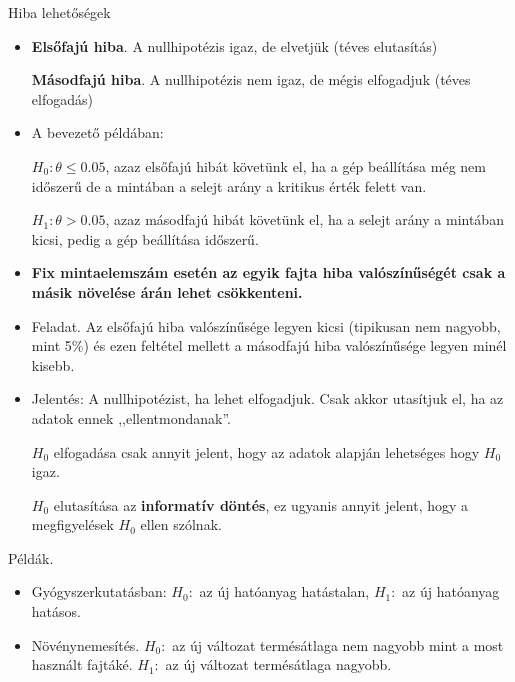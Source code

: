 \documentclass[aspectratio=169,notheorems,9pt,\option]{beamer}
\begin{document}
  
  \begin{frame}{Hiba lehetőségek}
   
    \begin{itemize}
    \item 
    
    \textbf{Elsőfajú hiba}. A nullhipotézis igaz, de elvetjük
      (téves elutasítás)
    
      \textbf{Másodfajú hiba}. A nullhipotézis nem igaz, de mégis elfogadjuk
      (téves elfogadás)
    
    \item A bevezető példában: 
    
    $H_0: \theta\leq0.05$, azaz elsőfajú hibát követünk el, ha a gép beállítása még nem időszerű
    de a mintában a selejt arány a kritikus érték felett van.

    $H_1: \theta>0.05$, azaz másodfajú hibát követünk el, ha a selejt arány a mintában kicsi, pedig a gép beállítása időszerű.

    \item \textbf{Fix mintaelemszám esetén az egyik fajta hiba valószínűségét
      csak a másik növelése árán lehet csökkenteni.}
      
    \item Feladat. Az elsőfajú hiba valószínűsége legyen kicsi (tipikusan
      nem nagyobb, mint 5\%) és ezen feltétel mellett a másodfajú hiba valószínűsége
      legyen minél kisebb.

    \item Jelentés: A nullhipotézist, ha lehet elfogadjuk. Csak akkor
      utasítjuk el, ha az adatok ennek ,,ellentmondanak''.
  
      $H_0$ elfogadása csak annyit jelent, hogy az adatok alapján lehetséges
      hogy  $H_0$ igaz.
  
      $H_0$ elutasítása az \textbf{informatív döntés}, ez ugyanis annyit jelent,
      hogy a megfigyelések $H_0$ ellen szólnak. %
    \end{itemize}
  
    \continue
    Példák.
    \begin{itemize}
    \item Gyógyszerkutatásban: $H_0:$ az új hatóanyag hatástalan, $H_1:$
      az új hatóanyag hatásos. 
    \item Növénynemesítés. $H_0:$ az új változat termésátlaga nem nagyobb
      mint a most használt fajtáké. $H_1:$ az új változat termésátlaga nagyobb.
    \end{itemize}
    
  \end{frame}
  
\end{document}
